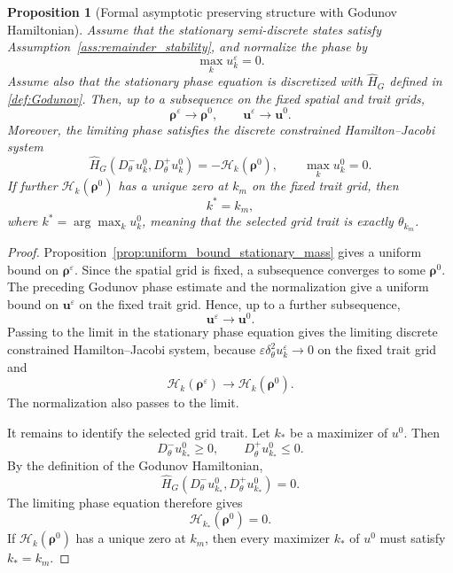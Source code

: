 \documentclass[11pt]{article}
\newtheorem{proposition}{Proposition}[section]
\begin{document}
\begin{proposition}[Formal asymptotic preserving structure with Godunov Hamiltonian]
\label{prop:formal_asymptotic preserving_trait_selection}
Assume that the stationary semi-discrete states satisfy
Assumption~\ref{ass:remainder_stability}, and normalize the phase by
\[
    \max_k u_k^\varepsilon=0 .
\]
Assume also that the stationary phase equation is discretized with
\(\widehat H_G\) defined in \eqref{def:Godunov}.  Then, up to a subsequence on
the fixed spatial and trait grids,
\[
    \boldsymbol\rho^\varepsilon\to \boldsymbol\rho^0,
    \qquad
    \boldsymbol u^\varepsilon\to \boldsymbol u^0 .
\]
Moreover, the limiting phase satisfies the discrete constrained
Hamilton--Jacobi system
\[
    \widehat H_G
    \left(
        D_\theta^-u_k^0,
        D_\theta^+u_k^0
    \right)
    =
    -\mathcal H_k(\boldsymbol\rho^0),
    \qquad
    \max_k u_k^0=0 .
\]
If further \(\mathcal H_k(\boldsymbol\rho^0)\) has a unique zero at
\(k_m\) on the fixed trait grid, then
\[
    k^*  = k_m,
\]
where $ k^* = \arg\max_k u_k^0$, meaning that the selected grid trait is exactly \(\theta_{k_m}\).
\end{proposition}

\begin{proof}
Proposition~\ref{prop:uniform_bound_stationary_mass} gives a uniform bound on
\(\boldsymbol\rho^\varepsilon\).  Since the spatial grid is fixed, a subsequence
converges to some \(\boldsymbol\rho^0\).  The preceding Godunov phase estimate
and the normalization give a uniform bound on \(\boldsymbol u^\varepsilon\) on
the fixed trait grid.  Hence, up to a further subsequence,
\[
    \boldsymbol u^\varepsilon\to \boldsymbol u^0 .
\]
Passing to the limit in the stationary phase equation gives the limiting
discrete constrained Hamilton--Jacobi system, because
\(\varepsilon\delta_\theta^2u_k^\varepsilon\to0\) on the fixed trait grid and
\[
    \mathcal H_k(\boldsymbol\rho^\varepsilon)
    \to
    \mathcal H_k(\boldsymbol\rho^0).
\]
The normalization also passes to the limit.

It remains to identify the selected grid trait.  Let \(k_*\) be a maximizer of
\(u^0\).  Then
\[
    D_\theta^-u_{k_*}^0\ge0,
    \qquad
    D_\theta^+u_{k_*}^0\le0 .
\]
By the definition of the Godunov Hamiltonian,
\[
    \widehat H_G
    \left(
        D_\theta^-u_{k_*}^0,
        D_\theta^+u_{k_*}^0
    \right)
    =
    0 .
\]
The limiting phase equation therefore gives
\[
    \mathcal H_{k_*}(\boldsymbol\rho^0)=0 .
\]
If \(\mathcal H_k(\boldsymbol\rho^0)\) has a unique zero at \(k_m\), then every
maximizer \(k_*\) of \(u^0\) must satisfy \(k_*=k_m\). 
\end{proof}
\end{document}
